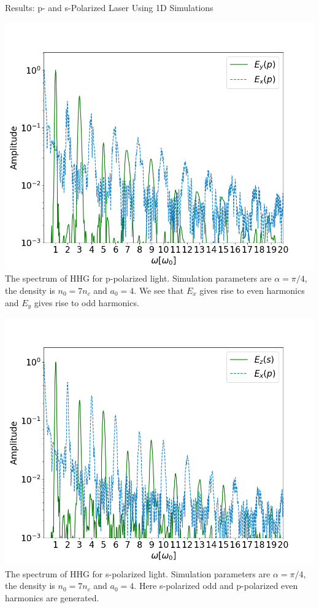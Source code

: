 \documentclass{beamer}
\begin{document}
\begin{frame}{Results: p- and s-Polarized Laser Using 1D Simulations}
    \begin{minipage}[h]{0.48\linewidth}
        \centering
        \includegraphics[width=1\textwidth, height=0.60\textheight]{images/p_fft.png}
        \scriptsize{The spectrum of HHG for p-polarized light. Simulation parameters are $\alpha = \pi/4$, the density is $n_0 = 7n_c$ and $a_0 = 4$. We see that $E_x$ gives rise to even harmonics and $E_y$ gives rise to odd harmonics.}
        \label{fig:p-peak}
    \end{minipage}
    \begin{minipage}[h]{0.48\linewidth}
        \centering
        \includegraphics[width=1\textwidth, height=0.60\textheight]{images/s_fft.png}
        \scriptsize{The spectrum of HHG for s-polarized light. Simulation parameters are $\alpha = \pi/4$, the density is $n_0 = 7n_c$ and $a_0 = 4$. Here s-polarized odd and p-polarized even harmonics are generated.}
        \label{fig:s-fft}
    \end{minipage}
\end{frame}
\end{document}
